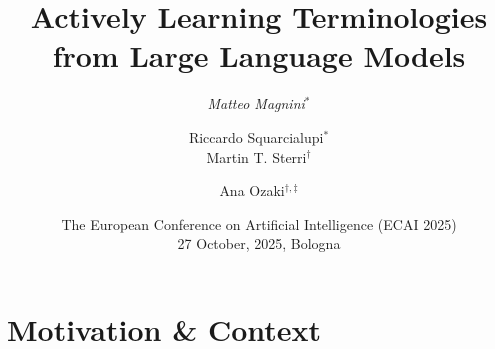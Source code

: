 \documentclass[handout]{beamer}\mode<handout>{\usetheme{AMSBolognaFC}}
\title[Learning \EL Terminologies from LLMs]{
    Actively Learning \EL Terminologies
    \\
    from Large Language Models
}
\author[Magnini et al.]{
	\emph{Matteo Magnini}$^{*}$ %
	\and 
	Riccardo Squarcialupi$^{*}$
	\\
	Martin T. Sterri$^{\dagger}$
	\and
	Ana Ozaki$^{\dagger,\ddagger}$
}
\institute[UniBo]{
    $^{*}$%
    \textsc{Alma Mater Studiorum} -- University of Bologna
    \\
    \texttt{
        \emph{matteo.magnini}@unibo.it, riccard.squarcialupi@studio.unibo.it
    }
    \vspace{.3cm}
    \\
    $^{\dagger}$University of Bergen
    \\
    \texttt{
        martin.sterri@student.uib.no, ana.ozaki@uib.no
    }
    \vspace{.3cm}
    \\
    $^{\ddagger}$University of Oslo
    \\
    \texttt{
        anaoz@ifi.uio.no
    }
}
\date[ECAI, 2025]{
	The European Conference on Artificial Intelligence (ECAI 2025)
	\\
	27 October, 2025, Bologna
}
\begin{document}

\frame{\titlepage}

\section{Motivation \& Context}
\end{document}
